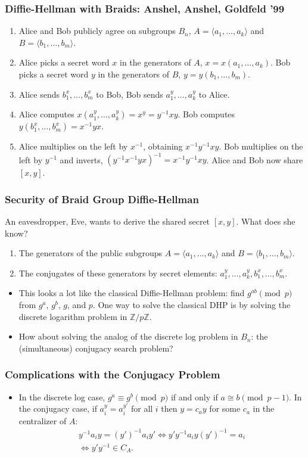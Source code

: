 \documentclass{beamer}
\newcommand{\integers}{\mathbb{Z}}
\begin{document}
\begin{frame}
	\frametitle{Diffie-Hellman with Braids: Anshel, Anshel, Goldfeld '99}
	\begin{enumerate}
		\item Alice and Bob publicly agree on subgroups $B_n$, $A = \langle a_1, \ldots, a_k\rangle$ and $B = \langle b_1, \ldots, b_m\rangle$.\pause
		\item Alice picks a secret word $x$ in the generators of $A$, $x = x(a_1, \ldots, a_k)$. Bob picks a secret word $y$ in the generators of $B$, $y = y(b_1, \ldots, b_m)$.\pause
		\item Alice sends $b_1^x,\ldots, b_m^x$ to Bob, Bob sends $a_1^y, \ldots, a_k^y$ to Alice.\pause
		\item Alice computes $x(a_1^y, \ldots, a_k^y) = x^y = y^{-1}xy$. Bob computes $y(b_1^x, \ldots, b_m^x) = x^{-1}yx$.\pause
		\item Alice multiplies on the left by $x^{-1}$, obtaining $x^{-1}y^{-1}xy$. Bob multiplies on the left by $y^{-1}$ and inverts, $(y^{-1}x^{-1}yx)^{-1} = x^{-1}y^{-1}xy$. Alice and Bob now share $[x,y]$.
	\end{enumerate}
\end{frame}

\begin{frame}
	\frametitle{Security of Braid Group Diffie-Hellman}
	An eavesdropper, Eve, wants to derive the shared secret $[x,y]$. What does she know?\pause
	\begin{enumerate}
		\item The generators of the public subgroups $A = \langle a_1, \ldots, a_k\rangle$ and $B = \langle b_1, \ldots, b_m\rangle$.\pause
		\item The conjugates of these generators by secret elements: $a_1^y, \ldots, a_k^y, b_1^x, \ldots, b_m^x$.\pause
	\end{enumerate}
	\begin{itemize}
	\item This looks a lot like the classical Diffie-Hellman problem: find $g^{ab}\pmod{p}$ from $g^a$, $g^b$, $g$, and $p$. One way to solve the classical DHP is by solving the discrete logarithm problem in $\integers/p\integers$.\pause
	\item How about solving the analog of the discrete log problem in $B_n$: the (simultaneous) conjugacy search problem?
	\end{itemize}
\end{frame}

\begin{frame}
	\frametitle{Complications with the Conjugacy Problem}
	\begin{itemize}
		\item In the discrete log case, $g^a \equiv g^b\pmod{p}$ if and only if $a\cong b \pmod{p-1}$. In the conjugacy case, if $a_i^y = a_i^{y'}$ for all $i$ then $y = c_ay$ for some $c_a$ in the centralizer of $A$:\pause
		\begin{multline*}
		y^{-1}a_iy = (y')^{-1}a_iy' \iff y'y^{-1}a_iy(y')^{-1} = a_i\\ \iff y'y^{-1}\in C_A.
		\end{multline*}
	\end{itemize}
\end{frame}
\end{document}

